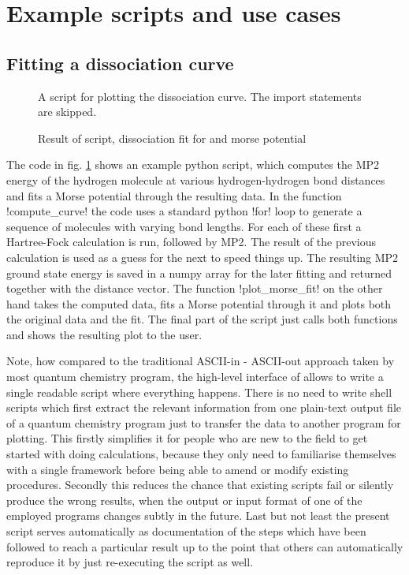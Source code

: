\section{Example scripts and use cases}
\label{sec:examples}


\subsection{Fitting a dissociation curve}
\label{sec:ex:data}
\begin{figure}
	
	\caption{A script for plotting the  dissociation curve. The import statements are skipped.}
	\label{fig:codeDissociation}
\end{figure}

\begin{figure}
	\centering
	\caption{Result of script, dissociation fit for  and morse potential}
	\label{fig:dissociation}
\end{figure}

The code in fig. \ref{fig:codeDissociation} shows an example python script,
which computes the MP2 energy of the hydrogen molecule at various hydrogen-hydrogen bond distances
and fits a Morse potential through the resulting data.
In the function \code!compute_curve! the code uses a standard python
\code!for! loop to generate a sequence of  molecules with varying bond lengths.
For each of these first a Hartree-Fock calculation is run, followed by MP2.
The result of the previous calculation is used as a guess for the next to speed things up.
The resulting MP2 ground state energy is saved in a numpy array for the later fitting
and returned together with the distance vector.
The function \code!plot_morse_fit! on the other hand
takes the computed data, fits a Morse potential through it and plots
both the original data and the fit.
The final part of the script just calls both functions and shows
the resulting plot to the user.

Note, how compared to the traditional ASCII-in - ASCII-out approach taken
by most quantum chemistry program, the high-level \python interface of \molsturm
allows to write a single readable script where everything happens.
There is no need to write shell scripts which first extract the relevant information
from one plain-text output file of a quantum chemistry program just to transfer the
data to another program for plotting.
This firstly simplifies it for people who are new to the field to get started
with doing calculations,
because they only need to familiarise themselves with a single framework
before being able to amend or modify existing procedures.
Secondly this reduces the chance that existing scripts fail
or silently produce the wrong results,
when the output or input format of one of the employed programs
changes subtly in the future.
Last but not least the present script serves automatically as documentation
of the steps which have been followed to reach a particular result
up to the point that others can automatically reproduce it by just re-executing
the script as well.

